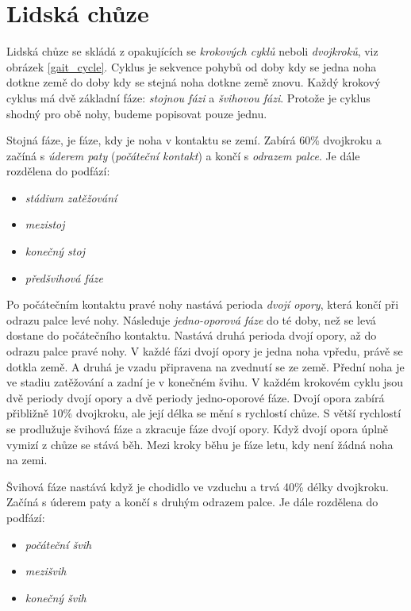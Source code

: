 \chapter{Lidská chůze}
Lidská chůze \cite{gait_review} se skládá z opakujících se \textit{krokových cyklů} neboli \textit{dvojkroků}, viz obrázek \ref{gait_cycle}. Cyklus je sekvence pohybů od doby kdy se jedna noha dotkne země do doby kdy se stejná noha dotkne země znovu. Každý krokový cyklus má dvě základní fáze: \textit{stojnou fázi} a \textit{švihovou fázi}. Protože je cyklus shodný pro obě nohy, budeme popisovat pouze jednu.

Stojná fáze, je fáze, kdy je noha v kontaktu se zemí. Zabírá 60\% dvojkroku a začíná s \textit{úderem paty} (\textit{počáteční kontakt}) a končí s \textit{odrazem palce}. Je dále rozdělena do podfází:
\begin{itemize}
\item \textit{stádium zatěžování}
\item \textit{mezistoj}
\item \textit{konečný stoj}
\item \textit{předšvihová fáze}
\end{itemize}
Po počátečním kontaktu pravé nohy nastává perioda \textit{dvojí opory}, která končí při odrazu palce levé nohy. Následuje \textit{jedno-oporová fáze} do té doby, než se levá dostane do počátečního kontaktu. Nastává druhá perioda dvojí opory, až do odrazu palce pravé nohy. V každé fázi dvojí opory je jedna noha vpředu, právě se dotkla země. A druhá je vzadu připravena na zvednutí se ze země. Přední noha je ve stadiu zatěžování  a zadní je v konečném švihu. V každém krokovém cyklu jsou dvě periody dvojí opory a dvě periody jedno-oporové fáze. Dvojí opora zabírá přibližně 10\% dvojkroku, ale její délka se mění s rychlostí chůze. S větší rychlostí se prodlužuje švihová fáze a zkracuje fáze dvojí opory. Když dvojí opora úplně vymizí z chůze se stává běh. Mezi kroky běhu je fáze letu, kdy není žádná noha na zemi.

Švihová fáze nastává když je chodidlo ve vzduchu a trvá 40\% délky dvojkroku. Začíná s úderem paty a končí s druhým odrazem palce.  Je dále rozdělena do podfází:
\begin{itemize}
\item \textit{počáteční švih}
\item \textit{mezišvih}
\item \textit{konečný švih}
\end{itemize}

